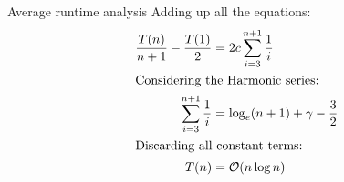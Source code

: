 \documentclass{beamer}
\begin{document}
\begin{frame}{Average runtime analysis}
    Adding up all the equations:
    \begin{align*}
        \frac{T(n)}{n+1} - \frac{T(1)}{2} &= 2c\sum_{i=3}^{n+1}\frac{1}{i} \\
        \intertext{Considering the Harmonic series:}
        \sum_{i=3}^{n+1}\frac{1}{i} &= \log_e(n+1) + \gamma - \frac{3}{2} \\
        \intertext{Discarding all constant terms:}
        T(n) &= \mathcal{O}(n\log n)
    \end{align*}
\end{frame}
\end{document}
